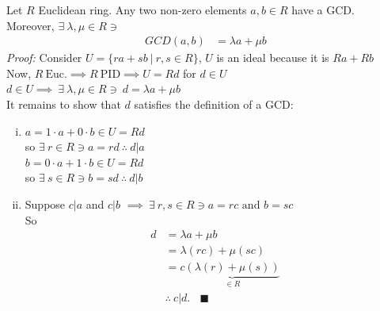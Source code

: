 \begin{lemma}
    Let $R$ Euclidean ring. Any two non-zero elements $a,b \in R$ have a GCD. Moreover,
    $\exists \ \lambda, \mu \in R \ni$
    \begin{align}
        GCD(a,b) &= \lambda a + \mu b \nonumber
    \end{align}
    \textit{Proof:} Consider $U=\{ra+sb \ | \ r,s \in R \}$, $U$ is an ideal because it is $Ra+Rb$
    \\ \steezybreak
    Now, $R\ \text{Euc.} \implies R \ \text{PID} \implies U=Rd$ for $d\in U$ \\ \steezybreak
    $d\in U \implies \ \exists \ \lambda, \mu \in R \ni \ d=\lambda a + \mu b$ \\ \steezybreak
    It remains to show that $d$ satisfies the definition of a GCD: \\
    \begin{enumerate}[(i)]
        \item $a=1\cdot a + 0\cdot b\in U = Rd$\\
        so $\exists \ r\in R \ni a=rd \ \therefore \ d|a$ \\
        $b=0\cdot a + 1\cdot b \in U = Rd$ \\
        so $\exists \ s\in R \ni b=sd \ \therefore \ d|b$ \\
        \item Suppose $c|a$ and $c|b$  $\implies \ \exists \ r,s \in R \ni a=rc  \text{ and } b=sc$
        \\
        So
        \begin{align}
            d &=\lambda a + \mu b \nonumber \\
            &= \lambda (rc) + \mu (sc) \nonumber \\
            &= c \underbrace{(\lambda(r) + \mu (s))}_{\in R} \nonumber \\
            &\therefore \ c|d. \ \ \ \ \blacksquare \nonumber
        \end{align}

    \end{enumerate}
\end{lemma}
